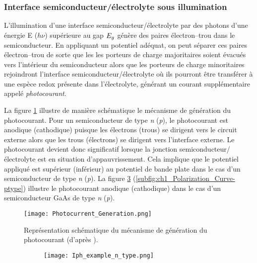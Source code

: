 \begin{refsection}
    \subsubsection{Interface semiconducteur/électrolyte sous
    illumination}\label{subsec:semiconductor_electrolyte_contact_light}
     
    L'illumination d'une interface semiconducteur/électrolyte par des photons d'une énergie E ($h\nu$) supérieure
    au gap $E_g$ génère des paires électron--trou dans le semiconducteur. En appliquant un potentiel adéquat,
    on peut séparer ces paires électron--trou de sorte que les 
    les porteurs de charge majoritaires soient évacués vers l'intérieur du semiconducteur alors que les
    porteurs de charge minoritaires rejoindront l'interface semiconducteur/électrolyte où ils pourront être transférer
    à une espèce redox présente dans
    l'électrolyte, générant un courant supplémentaire appelé \emph{photocourant}.

    La figure \ref{fig:photocurrent_generation} illustre de manière schématique le mécanisme de génération du photocourant.
    Pour un semiconducteur de type \emph{n} (\emph{p}), le photocourant est anodique (cathodique) puisque les électrons
    (trous) se dirigent vers le circuit externe alors que les trous (électrons) se dirigent vers l'interface externe. 
    Le photocourant devient donc significatif lorsque la jonction semiconducteur/électrolyte est en situation
    d'appauvrissement. Cela implique que le potentiel appliqué est supérieur (inférieur) au potentiel de bande plate
    dans le cas d'un semiconducteur de type \emph{n} (\emph{p}). 
    La figure \ref{subfig:ch1_Polarization_Curve-ntype} (\ref{subfig:ch1_Polarization_Curve-ptype}) illustre le
    photocourant anodique (cathodique) dans le cas d'un semiconducteur GaAs de type \emph{n} (\emph{p}).
    
    \begin{figure}[H]
        \centering
        \texttt{[image: Photocurrent\_Generation.png]}
        \caption[Représentation schématique du mécanisme de génération du photocourant.]
        {Représentation schématique du mécanisme de génération du photocourant (d'après \citet{Bard2002,
        Memming2008}).}
       \label{fig:photocurrent_generation}
    \end{figure}

    \begin{figure}[H]
        \centering
        \begin{subfigure}[b]{0.6\textwidth}
            \texttt{[image: Iph\_example\_n\_type.png]}
            \caption{}
            \label{subfig:ch1_Polarization_Curve-ntype}
        \end{subfigure}


\end{figure}
\end{refsection}
